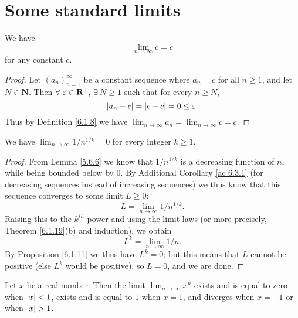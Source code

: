 \section{Some standard limits}\label{sec 6.5}

\begin{additional corollary}\label{ac 6.5.1}
We have
\[
    \lim_{n \to \infty} c = c
\]
for any constant \(c\).
\end{additional corollary}

\begin{proof}
    Let \((a_n)_{n = 1}^\infty\) be a constant sequence where \(a_n = c\) for all \(n \geq 1\), and let \(N \in \mathbf{N}\).
    Then \(\forall\ \varepsilon \in \mathbf{R}^+\), \(\exists\ N \geq 1\) such that for every \(n \geq N\),
    \[
        \abs*{a_n - c} = \abs*{c - c} = 0 \leq \varepsilon.
    \]
    Thus by Definition \ref{6.1.8} we have \(\lim_{n \to \infty} a_n = \lim_{n \to \infty} c = c\).
\end{proof}

\begin{corollary}\label{6.5.1}
    We have \(\lim_{n \to \infty} 1 / n^{1 / k} = 0\) for every integer \(k \geq 1\).
\end{corollary}

\begin{proof}
    From Lemma \ref{5.6.6} we know that \(1 / n^{1 / k}\) is a decreasing function of \(n\), while being bounded below by \(0\).
    By Additional Corollary \ref{ac 6.3.1} (for decreasing sequences instead of increasing sequences) we thus know that this sequence converges to some limit \(L \geq 0\):
    \[
        L = \lim_{n \to \infty} 1 / n^{1 / k}.
    \]
    Raising this to the \(k^{th}\) power and using the limit laws (or more precisely, Theorem \ref{6.1.19}(b) and induction), we obtain
    \[
        L^k = \lim_{n \to \infty} 1 / n.
    \]
    By Proposition \ref{6.1.11} we thus have \(L^k = 0\);
    but this means that \(L\) cannot be positive (else \(L^k\) would be positive), so \(L = 0\), and we are done.
\end{proof}

\begin{lemma}\label{6.5.2}
    Let \(x\) be a real number.
    Then the limit \(\lim_{n \to \infty} x^n\) exists and is equal to zero when \(\abs*{x} < 1\), exists and is equal to \(1\) when \(x = 1\), and diverges when \(x = -1\) or when \(\abs*{x} > 1\).
\end{lemma}

